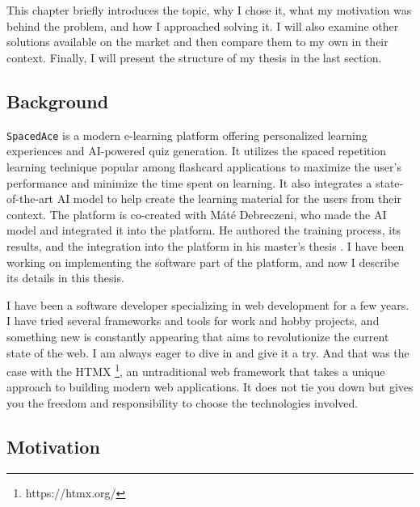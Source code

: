\chapter{\bevezetes}

This chapter briefly introduces the topic, why I chose it, what my motivation was behind the problem, and how I approached solving it. I will also examine other solutions available on the market and then compare them to my own in their context. Finally, I will present the structure of my thesis in the last section.

\section{Background}

\texttt{SpacedAce} is a modern e-learning platform offering personalized learning experiences and AI-powered quiz generation. It utilizes the spaced repetition learning technique popular among flashcard applications to maximize the user's performance and minimize the time spent on learning. It also integrates a state-of-the-art AI model to help create the learning material for the users from their context. The platform is co-created with Máté Debreczeni, who made the AI model and integrated it into the platform. He authored the training process, its results, and the integration into the platform in his master's thesis . I have been working on implementing the software part of the platform, and now I describe its details in this thesis.

I have been a software developer specializing in web development for a few years. I have tried several frameworks and tools for work and hobby projects, and something new is constantly appearing that aims to revolutionize the current state of the web. I am always eager to dive in and give it a try. And that was the case with the HTMX \footnote{https://htmx.org/}, an untraditional web framework that takes a unique approach to building modern web applications. It does not tie you down but gives you the freedom and responsibility to choose the technologies involved.

\section{Motivation}


